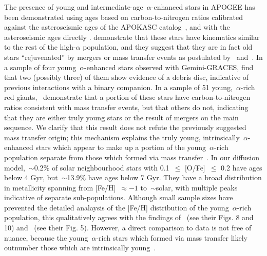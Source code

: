 \documentclass[draft2.tex]{subfiles}
\begin{document}
\par 
The presence of young and intermediate-age~$\alpha$-enhanced stars in APOGEE 
has been demonstrated using ages based on carbon-to-nitrogen ratios 
\citep{Martig2016} calibrated against the asteroseismic ages of the APOKASC 
catalog~\citep{Pinsonneault2014}, and with the asteroseismic ages directly 
\citep{Martig2015, Jofre2016, Izzard2018, SilvaAguirre2018}. 
\citet{SilvaAguirre2018} demonstrate that these stars have kinematics similar 
to the rest of the high-$\alpha$ population, and they suggest that they are 
in fact old stars ``rejuvenated'' by mergers or mass transfer events 
{\color{red} 
as postulated by~\citet{Jofre2016} and~\citet{Izzard2018}. 
In a sample of four young~$\alpha$-enhanced stars observed with Gemini-GRACES, 
\citet{Yong2016} find that two (possibly three) of them show evidence of a 
debris disc, indicative of previous interactions with a binary companion. 
} 
In a sample of 51 young,~$\alpha$-rich red giants,~\citet{Hekker2019} 
demonstrate that a portion of these stars have carbon-to-nitrogen ratios 
consistent with mass transfer events, but that others do not, indicating that 
they are either truly young stars or the result of mergers on the main 
sequence. 
{\color{red} 
We clarify that this result does not refute the previously suggested mass 
transfer origin; this mechanism explains the truly young, 
intrinsically~$\alpha$-enhanced stars which appear to make up a portion of the 
young~$\alpha$-rich population separate from those which formed via mass 
transfer~\citep{Yong2016, Hekker2019}. 
}
In our diffusion model,~$\sim$0.2\% of solar neighbourhood stars with 0.1~$\leq$ 
[O/Fe]~$\leq$ 0.2 have ages below 4 Gyr, but~$\sim$13.9\% have ages below 7 Gyr. 
{\color{red} 
They have a broad distribution in metallicity spanning from [Fe/H]~$\approx-1$ 
to~$\sim$solar, with multiple peaks indicative of separate sub-populations. 
Although small sample sizes have prevented the detailed analaysis of 
the [Fe/H] distribution of the young~$\alpha$-rich population, this 
qualitatively agrees with the findings of~\citet{SilvaAguirre2018} (see their 
Figs. 8 and 10) and~\citet{Miglio2021} (see their Fig. 5). 
However, a direct comparison to data is not free of nuance, because the 
young~$\alpha$-rich stars which formed via mass transfer likely outnumber those 
which are intrinsically young~\citep{Miglio2021}. 
} 
\end{document}

